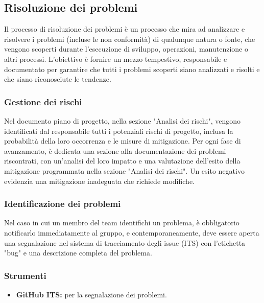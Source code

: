 \subsection{Risoluzione dei problemi}
Il processo di risoluzione dei problemi è un processo che mira ad analizzare e risolvere i problemi (incluse le non conformità) di qualunque natura o fonte, che vengono scoperti durante l'esecuzione di sviluppo, operazioni, manutenzione o altri processi.
L'obiettivo è fornire un mezzo tempestivo, responsabile e documentato per garantire che tutti i problemi scoperti siano analizzati e risolti e che siano riconosciute le tendenze.

\subsubsection{Gestione dei rischi}
Nel documento piano di progetto, nella sezione "Analisi dei rischi", vengono identificati dal responsabile tutti i potenziali rischi di progetto, inclusa la probabilità della loro occorrenza e le misure di mitigazione. Per ogni fase di avanzamento, è dedicata una sezione alla documentazione dei problemi riscontrati, con un'analisi del loro impatto e una valutazione dell'esito della mitigazione programmata nella sezione "Analisi dei rischi". Un esito negativo evidenzia una mitigazione inadeguata che richiede modifiche.

\subsubsection{Identificazione dei problemi}
Nel caso in cui un membro del team identifichi un problema, è obbligatorio notificarlo immediatamente al gruppo, e contemporaneamente, deve essere aperta una segnalazione nel sistema di tracciamento degli issue (ITS) con l'etichetta "bug" e una descrizione completa del problema.

\subsubsection{Strumenti}
\begin{itemize}
    \item \textbf{GitHub ITS:} 
        per la segnalazione dei problemi.
\end{itemize}